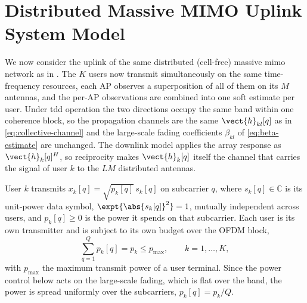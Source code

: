 \section{Distributed Massive MIMO Uplink System Model}
\label{sec:dmimo_ul_sysmodel}
We now consider the uplink of the same distributed (cell-free) massive \gls{mimo}
network as in . The $K$ users now transmit simultaneously on the same
time-frequency resources, each AP observes a superposition of all of them on its
$M$ antennas, and the per-AP observations are combined into one soft estimate per
user. Under \gls{tdd} operation the two directions occupy the same band within
one coherence block, so the propagation channels are the same $\vect{h}_{kl}[q]$
as in \eqref{eq:collective-channel} and the large-scale fading coefficients
$\beta_{kl}$ of \eqref{eq:beta-estimate} are unchanged. The downlink model
applies the array response as $\vect{h}_{k}[q]^{H}$, so reciprocity makes
$\vect{h}_{k}[q]$ itself the channel that carries the signal of user $k$ to the
$LM$ distributed antennas. 

User $k$ transmits $x_{k}[q]=\sqrt{p_{k}[q]}\,s_{k}[q]$ on subcarrier $q$, where
$s_{k}[q]\in\mathbb{C}$ is its unit-power data symbol,
$\expt{\abs{s_{k}[q]}^{2}}=1$, mutually independent across users, and
$p_{k}[q]\geq 0$ is the power it spends on that subcarrier. Each user is its own
transmitter and is subject to its own budget over the OFDM block,
\begin{equation}
\label{eq:ul-power-constraint}
\sum_{q=1}^{Q} p_{k}[q] = p_{k} \leq p_{\max},
\qquad k=1,\dots,K,
\end{equation}
with $p_{\max}$ the maximum transmit power of a user terminal. Since the power control below acts on the large-scale fading, which is flat over the band, the power is spread uniformly over the
subcarriers, $p_{k}[q]=p_{k}/Q$.

